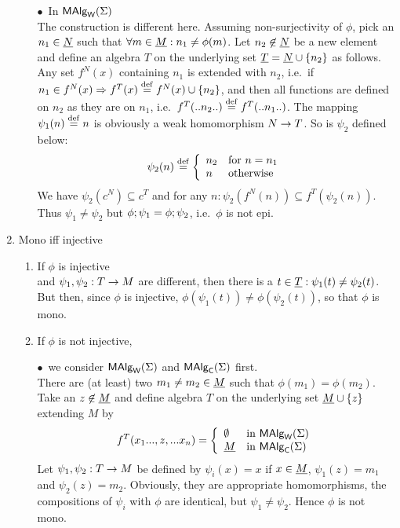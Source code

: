 \documentclass[10pt]{article}
\begin{document}
\begin{Proof}
\begin{enumerate}
\begin{enumerate}
$\bullet$\ In $\mbox{\rm\sf MAlg}_{\sf W}(\Sigma)$ \\ The construction is different here. Assuming
non-surjectivity of $\phi$, pick an $n_1\in\underline {N}$ such that
$\forall m\in\underline {M}:n_1\not=\phi(m)$. Let $n_2\not\in\underline {N}$ be a
new element and define an algebra $T$ on the underlying set $\underline {T}=\underline {N}\cup\{n_2\}$ as follows. Any set $f^N(x)$ containing $n_1$
is extended with $n_2$, i.e.\ if $n_1\in f^N(x) \Rightarrow f^T(x)\stackrel{{\rm \tiny{def}}}=
f^N(x)\cup\{n_2\}$, and then all functions are defined on $n_2$
as they are on $n_1$, i.e.\ $f^T(..n_2..)\stackrel{{\rm \tiny{def}}}= f^T(..n_1..)$.  The
mapping $\psi_1(n)\stackrel{{\rm \tiny{def}}}= n$ is obviously a weak homomorphism $N\rightarrow
T$. So is $\psi_2$ defined below:
\[
\psi_2(n) \stackrel{{\rm \tiny{def}}}= \left\{\begin{array}{ll} n_2 & {\rm for\ }n=n_1 \\ 
                                        n & {\rm otherwise}
                      \end{array}\right.
\] 
We have $\psi_2(c^N)\subseteq c^T$ and for any $n:
\psi_2(f^N(n))\subseteq f^T(\psi_2(n))$. Thus
$\psi_1\not=\psi_2$ but $\phi;\psi_1=\phi;\psi_2$, i.e.\
$\phi$ is not epi.

\end{enumerate}

\item 
Mono iff injective

\begin{enumerate}\MyLPar

\item %

If $\phi$ is injective \\
and $\psi_1,\psi_2:T\rightarrow M$ are different, then there is a
$t\in\underline {T}:\psi_1(t)\not=\psi_2(t)$. But then, since $\phi$ is
injective, $\phi(\psi_1(t))\not=\phi(\psi_2(t))$, so that $\phi$ is
mono.
%
\item %

If $\phi$ is not injective, 

$\bullet$\ we consider $\mbox{\rm\sf MAlg}_{\sf W}(\Sigma)$ and $\mbox{\rm\sf MAlg}_{\sf C}(\Sigma)$ first.\\
There are (at least) two $m_1\not=m_2\in\underline {M}$ such that
$\phi(m_1)=\phi(m_2)$.  Take an $z\not\in\underline {M}$ and define algebra
$T$ on the underlying set $\underline {M}\cup\{z\}$ extending $M$ by
\[
f^{T}(x_1...,z,... x_n)=
\left\{\begin{array}{ll} \emptyset      & {\rm in\ }\mbox{\rm\sf MAlg}_{\sf W}(\Sigma)\\
                         \underline {M} & {\rm in\ } \mbox{\rm\sf MAlg}_{\sf C}(\Sigma)
       \end{array} \right.
\]
Let $\psi_1, \psi_2:T\rightarrow M$ be defined by $\psi_i(x)=x$ if
$x\in\underline {M}$, $\psi_1(z)=m_1$ and $\psi_2(z)=m_2$. Obviously, they
are appropriate homomorphisms, the compositions of $\psi_i$ with
$\phi$ are identical, but $\psi_1\not=\psi_2$. Hence $\phi$ is not
mono.


\end{enumerate}
\end{enumerate}
\end{Proof}
\end{document}
